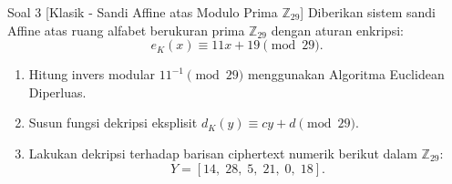 \documentclass[11pt,a4paper]{article}
\begin{document}
\begin{soalklasik}{Soal 3 [Klasik - Sandi Affine atas Modulo Prima $\mathbb{Z}_{29}$]}
Diberikan sistem sandi Affine atas ruang alfabet berukuran prima $\mathbb{Z}_{29}$ dengan aturan enkripsi:
\[
e_K(x) \equiv 11x + 19 \pmod{29}.
\]
\begin{enumerate}[label=(\alph*)]
    \item Hitung invers modular $11^{-1} \pmod{29}$ menggunakan Algoritma Euclidean Diperluas.
    \item Susun fungsi dekripsi eksplisit $d_K(y) \equiv c y + d \pmod{29}$.
    \item Lakukan dekripsi terhadap barisan ciphertext numerik berikut dalam $\mathbb{Z}_{29}$:
    \[
    Y = [14, \; 28, \; 5, \; 21, \; 0, \; 18].
    \]
\end{enumerate}
\end{soalklasik}
\end{document}
